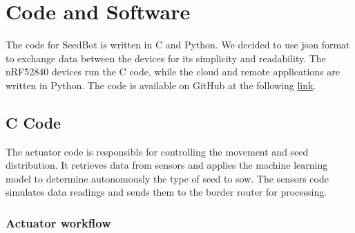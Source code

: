 \chapter{Code and Software}

The code for SeedBot is written in C and Python. We decided to use json format to exchange data between the devices for its simplicity and readability. The nRF52840 devices run the C code, while the cloud and remote applications are written in Python. The code is available on GitHub at the following \href {https://github.com/franocella/SeedBot_IoT}{link}. 
\section{C Code}
The actuator code is responsible for controlling the movement and seed distribution. It retrieves data from sensors and applies the machine learning model to determine autonomously the type of seed to sow.
The sensors code simulates data readings and sends them to the border router for processing.\\

\subsection{Actuator workflow}

